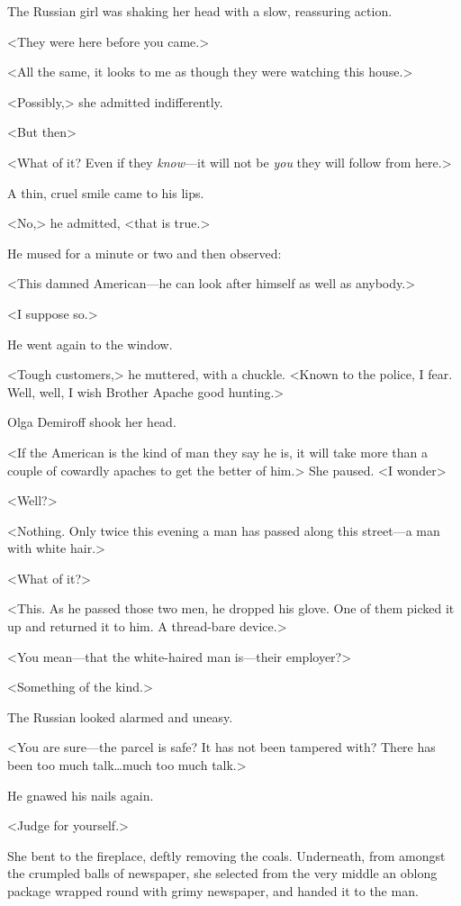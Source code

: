 The Russian girl was shaking her head with a slow, reassuring action.

<They were here before you came.>

<All the same, it looks to me as though they were watching this house.>

<Possibly,> she admitted indifferently.

<But then\longdash>

<What of it? Even if they \emph{know}—it will not be \emph{you} they will follow from here.>

A thin, cruel smile came to his lips.

<No,> he admitted, <that is true.>

He mused for a minute or two and then observed:

<This damned American—he can look after himself as well as anybody.>

<I suppose so.>

He went again to the window.

<Tough customers,> he muttered, with a chuckle. <Known to the police, I fear. Well, well, I wish Brother Apache good hunting.>

Olga Demiroff shook her head.

<If the American is the kind of man they say he is, it will take more than a couple of cowardly apaches to get the better of him.> She paused. <I wonder\longdash>

<Well?>

<Nothing. Only twice this evening a man has passed along this street—a man with white hair.>

<What of it?>

<This. As he passed those two men, he dropped his glove. One of them picked it up and returned it to him. A thread-bare device.>

<You mean—that the white-haired man is—their employer?>

<Something of the kind.>

The Russian looked alarmed and uneasy.

<You are sure—the parcel is safe? It has not been tampered with? There has been too much talk\dots much too much talk.>

He gnawed his nails again.

<Judge for yourself.>

She bent to the fireplace, deftly removing the coals. Underneath, from amongst the crumpled balls of newspaper, she selected from the very middle an oblong package wrapped round with grimy newspaper, and handed it to the man.


